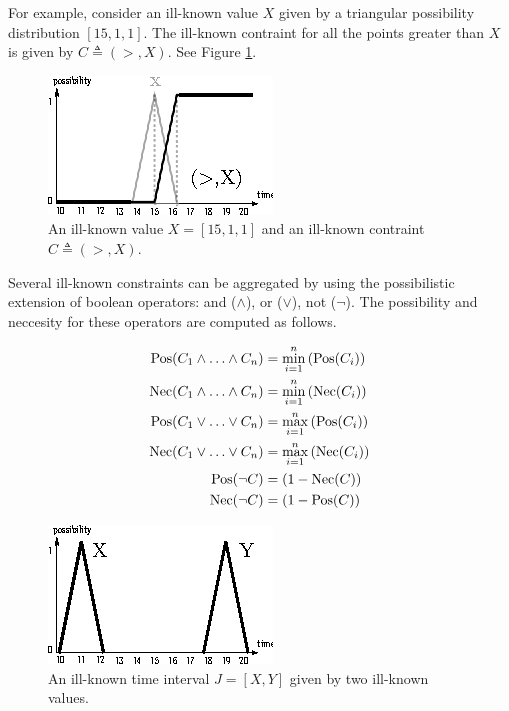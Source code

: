 For example, consider an ill-known value $X$ given by a triangular possibility distribution $\left[15, 1, 1\right]$. The ill-known contraint for all the points greater than $X$ is given by $C \triangleq (>, X)$. See Figure \ref{fig:ikc-greater}.
 
\begin{figure}[h]
   \centering
   \includegraphics[scale=1.5]{graphs/gt.eps}
   \caption{An ill-known value $X = \left[15, 1, 1\right]$ and an ill-known contraint $C \triangleq (>, X)$. }
   \label{fig:ikc-greater}
 \end{figure}


Several ill-known constraints can be aggregated by using the possibilistic extension of boolean operators: and ($\wedge$), or ($\vee$), not ($\neg$). The possibility and neccesity for these operators are computed as follows. 

\begin{align}
\operatorname{Pos}(C_1 \wedge \ldots \wedge C_n) & = \min_{i= 1}^{n} \left(\operatorname{Pos}(C_i)\right) \label{and-ill-known-pos}\\
\operatorname{Nec}(C_1 \wedge \ldots \wedge C_n) & = \min_{i= 1}^{n} \left( \operatorname{Nec}(C_i )\right) \label{and-ill-known-nec}\\
\operatorname{Pos}(C_1 \vee \ldots \vee C_n) & = \max_{i= 1}^{n} \left(\operatorname{Pos}(C_i)\right) \label{or-ill-known-pos}\\
\operatorname{Nec}(C_1 \vee \ldots \vee C_n) & = \max_{i= 1}^{n} \left( \operatorname{Nec}(C_i )\right) \label{or-ill-known-nec}\\
\operatorname{Pos}( \neg C) & =  \left(1-\operatorname{Nec}(C)\right) \label{not-ill-known-pos}\\
\operatorname{Nec}(\neg C) & = \left(1- \operatorname{Pos}(C)\right) \label{not-ill-known-nec}
\end{align}


 \begin{figure}[h]
   \centering
   \includegraphics[scale=1.5]{graphs/ill-known-ti.eps}
   \caption{An ill-known time interval $J = \left[X, Y  \right]$ given by two ill-known values. }
   \label{fig:ill-known-ti}
 \end{figure}


